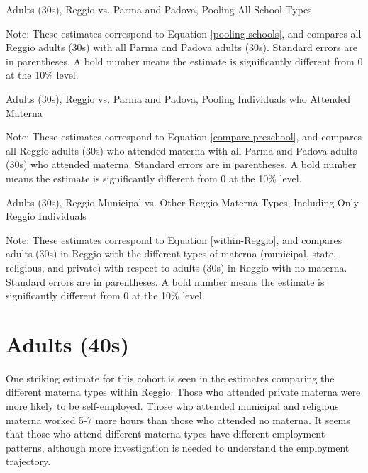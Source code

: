 \documentclass{article}
\begin{document}
\begin{table}[H]
\begin{center}
	\caption{Adults (30s), Reggio vs. Parma and Padova, Pooling All School Types}
	\scalebox{0.9}{
				
		}
\end{center}
\raggedright
\footnotesize
Note: These estimates correspond to Equation \ref{pooling-schools}, and compares all Reggio adults (30s) with all Parma and Padova adults (30s). Standard errors are in parentheses. A bold number means the estimate is significantly different from 0 at the 10\% level. 
\end{table}

\begin{table}[H]
\begin{center}
	\caption{Adults (30s), Reggio vs. Parma and Padova, Pooling Individuals who Attended Materna}
	\scalebox{0.9}{
				
		}
\end{center}
\raggedright
\footnotesize
Note: These estimates correspond to Equation \ref{compare-preschool}, and compares all Reggio adults (30s) who attended materna with all Parma and Padova adults (30s) who attended materna. Standard errors are in parentheses. A bold number means the estimate is significantly different from 0 at the 10\% level. 
\end{table}

\begin{table}[H]
\begin{center}
	\caption{Adults (30s), Reggio Municipal vs. Other Reggio Materna Types, Including Only Reggio Individuals}
		
\end{center}
\raggedright
\footnotesize
Note: These estimates correspond to Equation \ref{within-Reggio}, and compares adults (30s) in Reggio with the different types of materna (municipal, state, religious, and private) with respect to adults (30s) in Reggio with no materna. Standard errors are in parentheses. A bold number means the estimate is significantly different from 0 at the 10\% level. 
\end{table}


\section{Adults (40s)}
One striking estimate for this cohort is seen in the estimates comparing the different materna types within Reggio. Those who attended private materna were more likely to be self-employed. Those who attended municipal and religious materna worked 5-7 more hours than those who attended no materna. It seems that those who attend different materna types have different employment patterns, although more investigation is needed to understand the employment trajectory.
\end{document}
